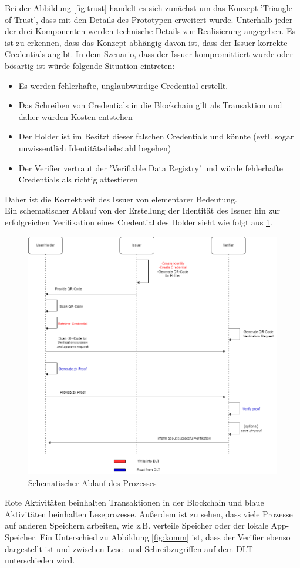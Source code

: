 Bei der Abbildung \ref{fig:trust} handelt es sich zunächst um das Konzept 'Triangle of Trust', dass mit den Details des Prototypen erweitert wurde. Unterhalb jeder der drei Komponenten werden technische Details zur Realisierung angegeben. Es ist zu erkennen, dass das Konzept abhängig davon ist, dass der Issuer korrekte Credentials angibt. In dem Szenario, dass der Issuer kompromittiert wurde oder bösartig ist würde folgende Situation eintreten:
\begin{itemize}
	\item Es werden fehlerhafte, unglaubwürdige Credential erstellt.
	\item Das Schreiben von Credentials in die Blockchain gilt als Transaktion und daher würden Kosten entstehen
	\item Der Holder ist im Besitzt dieser falschen Credentials und könnte (evtl. sogar unwissentlich Identitätsdiebstahl begehen)
	\item Der Verifier vertraut der 'Verifiable Data Registry' und würde fehlerhafte Credentials als richtig attestieren
\end{itemize} 
Daher ist die Korrektheit des Issuer von elementarer Bedeutung. \\
Ein schematischer Ablauf von der Erstellung der Identität des Issuer hin zur erfolgreichen Verifikation eines Credential des Holder sieht wie folgt aus \ref{fig:kommunikation}.
\begin{figure}[H]
	\centering
	\includegraphics[scale=0.4]{media/kommunikation}
	\caption{Schematischer Ablauf des Prozesses}
	\label{fig:kommunikation}
\end{figure}
Rote Aktivitäten beinhalten Transaktionen in der Blockchain und blaue Aktivitäten beinhalten Leseprozesse. Außerdem ist zu sehen, dass viele Prozesse auf anderen Speichern arbeiten, wie z.B. verteile Speicher oder der lokale App-Speicher. Ein Unterschied zu Abbildung \ref{fig:komm} ist, dass der Verifier ebenso dargestellt ist und zwischen Lese- und Schreibzugriffen auf dem DLT unterschieden wird.
